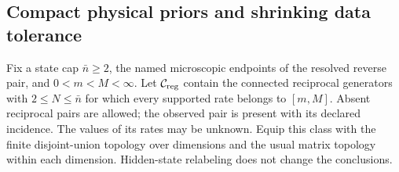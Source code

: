 \subsection{Compact physical priors and shrinking data tolerance}
\label{subsec:compact-priors}
Fix a state cap $\bar n\ge2$, the named microscopic endpoints of the
resolved reverse pair, and $0<m<M<\infty$. Let $\mathcal C_{\rm reg}$ contain the
connected reciprocal generators with $2\le N\le\bar n$ for which every
supported rate belongs to $[m,M]$. Absent reciprocal pairs are allowed;
the observed pair is present with its declared incidence. The values of
its rates may be unknown. Equip this class with the finite disjoint-union
topology over dimensions and the usual matrix topology within each
dimension. Hidden-state relabeling does not change the conclusions.

